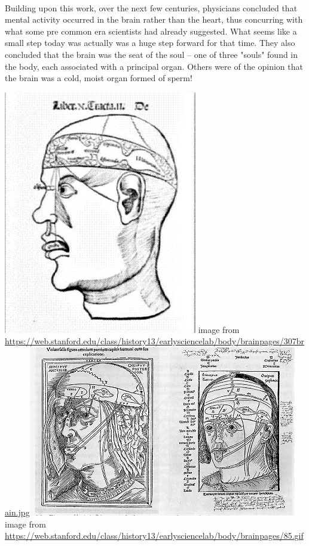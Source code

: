 \documentclass[12pt,a4paper]{article}
\begin{document}
\paragraph{}
Building upon this work, over the next few centuries, physicians concluded that mental activity occurred in the brain rather than the heart, thus concurring with what some pre common era scientists had already suggested.  What seems like a small step today was actually was a huge step forward for that time. They also concluded that the brain was the seat of the soul -- one of three "souls" found in the body, each associated with a principal organ.  Others were of the opinion that the brain was a cold, moist organ formed of sperm!

\includegraphics[scale=0.5]{307brain.jpg}\newline
image from \url{https://web.stanford.edu/class/history13/earlysciencelab/body/brainpages/307brain.jpg}\newline \includegraphics[scale=0.4]{brain85.jpg}\newline
image from \url{https://web.stanford.edu/class/history13/earlysciencelab/body/brainpages/85.gif}\newline
\end{document}
